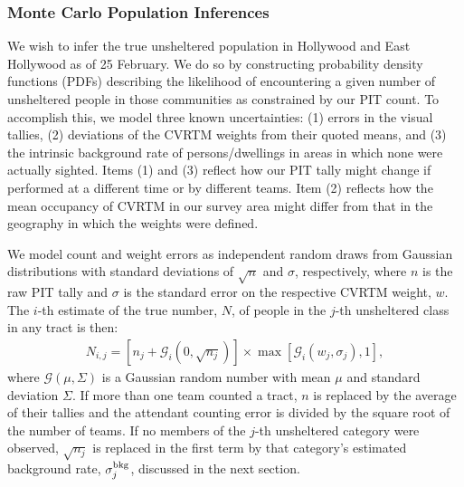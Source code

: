 \documentclass[11pt,twocolumn]{article}
\def\Count{count}
\def\resp{respectively}
\begin{document}

%
%

\subsubsection{Monte Carlo Population Inferences}
\label{sec:mc}

We wish to infer the true unsheltered population in Hollywood and East Hollywood as of 25 February. 
We do so by constructing probability density functions (PDFs) describing the likelihood of encountering 
a given number of unsheltered people in those communities as constrained by our PIT \Count. 
To accomplish this, we model three known uncertainties: (1) errors in the visual tallies, (2) deviations 
of the CVRTM weights from their quoted means, and (3) the intrinsic background rate of persons/dwellings
in areas in which none were actually sighted. Items (1) and (3) reflect how our PIT tally might change
if performed at a different time or by different teams. Item (2) reflects how the mean 
occupancy of CVRTM in our survey area might differ from that in the geography in which the weights 
were defined.

We model count and weight errors as independent random draws from Gaussian distributions with 
standard deviations of $\sqrt{n}$ and $\sigma$, \resp, where $n$ is the raw PIT tally and 
$\sigma$ is the standard error on the respective CVRTM weight, $w$. 
The $i$-th estimate of the true number, $N$, of people in the $j$-th unsheltered class in any 
tract is then: 
\begin{multline}\label{eq:monte}
	N_{i,j} = \left[n_{j} + \mathcal{G}_{i}(0,\sqrt{n_{j}})\right]\times\max[\mathcal{G}_{i}(w_{j}, \sigma_{j}),1],
\end{multline}
where $\mathcal{G}(\mu,\Sigma)$ is a Gaussian random number with mean $\mu$ and standard deviation 
$\Sigma$. If more than one team counted a tract, $n$ is replaced by the average of their tallies 
and the attendant counting error is divided by the square root of the number of teams. If no members
of the $j$-th unsheltered category were observed, $\sqrt{n_{j}}$ is replaced in the first term 
by that category's estimated background rate, $\sigma_{j}^{\rm bkg}$, discussed in the next section.%
\end{document}
